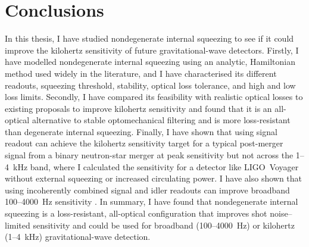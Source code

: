 \chapter{Conclusions}
\label{chp:future_work_and_conclusions}

In this thesis, I have studied nondegenerate internal squeezing to see if it could improve the kilohertz sensitivity of future gravitational-wave detectors.
Firstly, I have modelled nondegenerate internal squeezing using an analytic, Hamiltonian method used widely in the literature, and I have characterised its different readouts, squeezing threshold, stability, optical loss tolerance, and high and low loss limits.  Secondly, I have compared its feasibility with realistic optical losses to existing proposals to improve kilohertz sensitivity and found that it is an all-optical alternative to stable optomechanical filtering and is more loss-resistant than degenerate internal squeezing. Finally, I have shown that using signal readout can achieve the kilohertz sensitivity target for a typical post-merger signal from a binary neutron-star merger at peak sensitivity but not across the 1--4~kHz band, where I calculated the sensitivity for a detector like LIGO~Voyager without external squeezing or increased circulating power. I have also shown that using incoherently combined signal and idler readouts can improve broadband 100--4000~Hz  sensitivity .
In summary, I have found that nondegenerate internal squeezing is a loss-resistant, all-optical configuration that improves shot noise--limited sensitivity and could be used for broadband (100--4000~Hz) or kilohertz (1--4~kHz) gravitational-wave detection.

